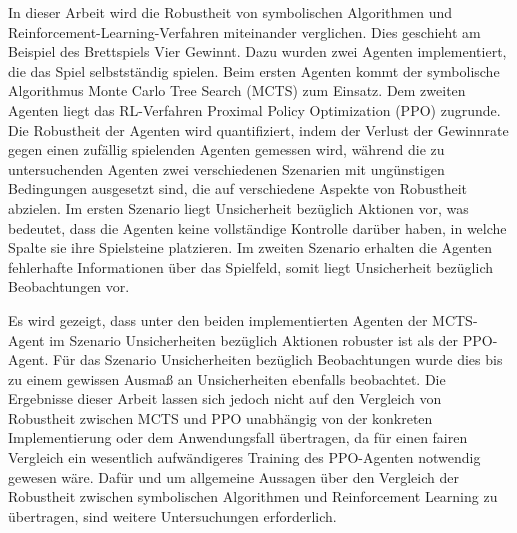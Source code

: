 In dieser Arbeit wird die Robustheit von symbolischen Algorithmen und Reinforcement-Learning-Verfahren miteinander verglichen. Dies geschieht am Beispiel des Brettspiels Vier Gewinnt. Dazu wurden zwei Agenten implementiert, die das Spiel selbstständig spielen. Beim ersten Agenten kommt der symbolische Algorithmus Monte Carlo Tree Search (MCTS) zum Einsatz. Dem zweiten Agenten liegt das RL-Verfahren Proximal Policy Optimization (PPO) zugrunde. Die Robustheit der Agenten wird quantifiziert, indem der Verlust der Gewinnrate gegen einen zufällig spielenden Agenten gemessen wird, während die zu untersuchenden Agenten zwei verschiedenen Szenarien mit ungünstigen Bedingungen ausgesetzt sind, die auf verschiedene Aspekte von Robustheit abzielen. Im ersten Szenario liegt Unsicherheit bezüglich Aktionen vor, was bedeutet, dass die Agenten keine vollständige Kontrolle darüber haben, in welche Spalte sie ihre Spielsteine platzieren. Im zweiten Szenario erhalten die Agenten fehlerhafte Informationen über das Spielfeld, somit liegt Unsicherheit bezüglich Beobachtungen vor.

Es wird gezeigt, dass unter den beiden implementierten Agenten der MCTS-Agent im Szenario Unsicherheiten bezüglich Aktionen robuster ist als der PPO-Agent. Für das Szenario Unsicherheiten bezüglich Beobachtungen wurde dies bis zu einem gewissen Ausmaß an Unsicherheiten ebenfalls beobachtet. Die Ergebnisse dieser Arbeit lassen sich jedoch nicht auf den Vergleich von Robustheit zwischen MCTS und PPO unabhängig von der konkreten Implementierung oder dem Anwendungsfall übertragen, da für einen fairen Vergleich ein wesentlich aufwändigeres Training des PPO-Agenten notwendig gewesen wäre. Dafür und um allgemeine Aussagen über den Vergleich der Robustheit zwischen symbolischen Algorithmen und Reinforcement Learning zu übertragen, sind weitere Untersuchungen erforderlich.

\newpage